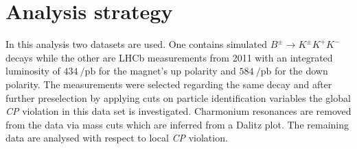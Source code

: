 \section{Analysis strategy}
\label{sec:Durchführung}
In this analysis two datasets are used. One contains simulated $B^\pm \to K^\pm K^+ K^-$ decays while the other are LHCb measurements from 2011 with an 
integrated luminosity of $\SI{434}{\per\pico\barn}$ for the magnet's up polarity and $\SI{584}{\per\pico\barn}$ for the down polarity. The measurements 
were selected regarding the same decay and after further preselection by applying cuts on particle identification variables the global \textit{CP} violation 
in this data set is investigated. Charmonium resonances are removed from the data via mass cuts which are inferred from a Dalitz plot. The remaining data 
are analysed with respect to local \textit{CP} violation.
